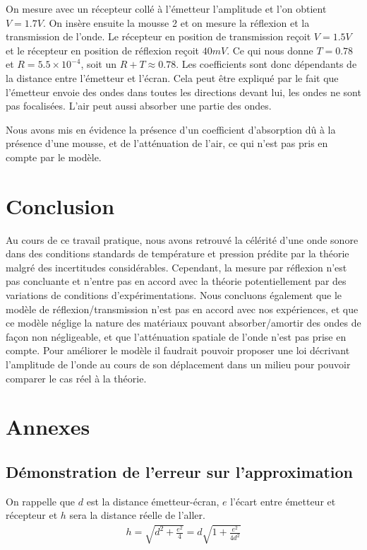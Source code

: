 \documentclass[12pt]{article}
\begin{document}
On mesure avec un récepteur collé à l'émetteur l'amplitude et l'on obtient $V = 1.7V$. On insère ensuite la mousse 2 et on mesure la réflexion et la transmission de l'onde.
Le récepteur en position de transmission reçoit $V=1.5V$ et le récepteur en position de réflexion reçoit $40mV$. Ce qui nous donne $T=0.78$ et $R=5.5\times 10^{-4}$, soit un $R+T \approx 0.78$. Les coefficients sont donc dépendants de la distance entre l'émetteur et l'écran. Cela peut être expliqué par le fait que l'émetteur envoie des ondes dans toutes les directions devant lui, les ondes ne sont pas focalisées. L'air peut aussi absorber une partie des ondes. 
 
Nous avons mis en évidence la présence d'un coefficient d'absorption dû à la présence
d'une mousse, et de l'atténuation de l'air, ce qui n'est pas pris en compte par le modèle.

\section{Conclusion}
Au cours de ce travail pratique, nous avons retrouvé la célérité d'une onde sonore dans des conditions standards de température et pression prédite par la théorie malgré des incertitudes considérables.
Cependant, la mesure par réflexion n'est pas concluante et n'entre pas en accord avec la théorie potentiellement par des variations de conditions d'expérimentations. Nous concluons également
que le modèle de réflexion/transmission n'est pas en accord avec nos expériences, et que ce modèle néglige la nature des matériaux pouvant absorber/amortir des ondes de façon non négligeable, et que l'atténuation
spatiale de l'onde n'est pas prise en compte. Pour améliorer le modèle il faudrait pouvoir proposer une loi décrivant l'amplitude de l'onde au cours de son déplacement dans un milieu pour pouvoir comparer le cas réel à la théorie.

\break
\section*{Annexes}
\subsection*{Démonstration de l'erreur sur l'approximation}
On rappelle que $d$ est la distance émetteur-écran, $e$ l'écart entre émetteur et récepteur et $h$ sera la distance réelle de l'aller.
\begin{align}
	h = \sqrt{d^2 + \frac{e^2}{4}} = d\sqrt{1+ \frac{e^2}{4d^2}}
\end{align}
\end{document}
